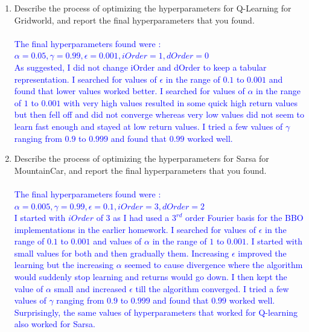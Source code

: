 \documentclass[]{article}
\begin{document}
\begin{enumerate}
    \item Describe the process of optimizing the hyperparameters for Q-Learning for Gridworld, and report the final hyperparameters that you found.
    \\\\
    \textcolor{blue}{
    	The final hyperparameters found were :\\
    	$
    	\alpha  = 0.05,
    	\gamma = 0.99,
    	\epsilon = 0.001,
    	iOrder = 1,
    	dOrder = 0
    	$\\
    	As suggested, I did not change iOrder and dOrder to keep a tabular representation. I searched for values of $\epsilon$ in the range of $0.1$ to $0.001$ and found that lower values worked better. I searched for values of $\alpha$ in the range of $1$ to $0.001$ with very high values resulted in some quick high return values but then fell off and did not converge whereas very low values did not seem to learn fast enough and stayed at low return values. I tried a few values of $\gamma$ ranging from $0.9$ to $0.999$ and found that $0.99$ worked well.
    }


    \item Describe the process of optimizing the hyperparameters for Sarsa for MountainCar, and report the final hyperparameters that you found.
    \\\\
    \textcolor{blue}{
    	The final hyperparameters found were :\\
    	$
    	\alpha  = 0.005,
    	\gamma = 0.99,
    	\epsilon = 0.1,
    	iOrder = 3,
    	dOrder = 2
    	$\\
    	I started with $iOrder$ of 3 as I had used a $3^{rd}$ order Fourier basis for the BBO implementations in the earlier homework. I searched for values of $\epsilon$ in the range of $0.1$ to $0.001$ and values of $\alpha$ in the range of $1$ to $0.001$.  I started with small values for both and then gradually them. Increasing $\epsilon$ improved the learning but the increasing $\alpha$ seemed to cause divergence where the algorithm would suddenly stop learning and returns would go down. I then kept the value of $\alpha$ small and increased $\epsilon$ till the algorithm converged. I tried a few values of $\gamma$ ranging from $0.9$ to $0.999$ and found that $0.99$ worked well. Surprisingly, the same values of hyperparameters that worked for Q-learning also worked for Sarsa.
    }


\end{enumerate}
\end{document}
